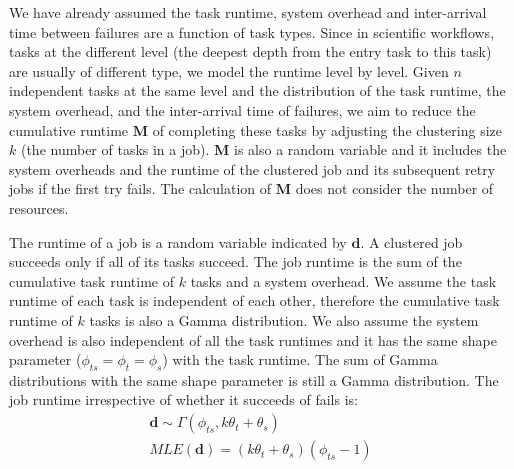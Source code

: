 \documentclass{IOS-Book-Article}
\begin{document}
We have already assumed the task runtime, system overhead and inter-arrival time between failures are a function of task types. Since in scientific workflows, tasks at the different level (the deepest depth from the entry task to this task) are usually of different type, we model the runtime level by level. Given $n$ independent tasks at the same level and the distribution of the task runtime, the system overhead, and the inter-arrival time of failures, we aim to reduce the cumulative runtime $\bm M$ of completing these tasks by adjusting the clustering size $k$ (the number of tasks in a job). 
$\bm M$ is also a random variable and it includes the system overheads and the runtime of the clustered job and its subsequent retry jobs if the first try fails. The calculation of $\bm M$ does not consider the number of resources. 

The runtime of a job is a random variable indicated by $\bm d$. A clustered job succeeds only if all of its tasks succeed. The job runtime is the sum of the cumulative task runtime of $k$ tasks and a system overhead. We assume the task runtime of each task is independent of each other, therefore the cumulative task runtime of $k$ tasks is also a Gamma distribution. We also assume the system overhead is also independent of all the task runtimes and it has the same shape parameter ($\phi_{ts}=\phi_{t}=\phi_{s}$) with the task runtime. 
The sum of Gamma distributions with the same shape parameter is still a Gamma distribution.  The job runtime irrespective of whether it succeeds of fails is:
\begin{eqnarray}
\displaystyle
\bm{d}\sim\Gamma(\phi_{ts}, k\theta_t+\theta_s)\\
MLE(\bm{d})=\displaystyle{(k\theta_t+\theta_s) }{(\phi_{ts}-1)}
\label{eq:N}
\end{eqnarray}
\end{document}
